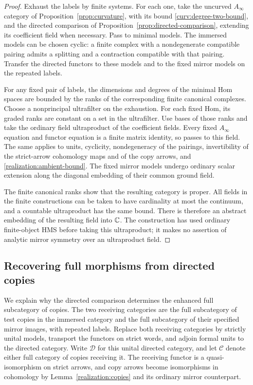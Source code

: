 \begin{proof}
Exhaust the labels by finite systems.  For each one, take the uncurved
$A_\infty$ category of Proposition~\ref{prop:curvature}, with its bound
\eqref{curv:degree-two-bound}, and the
directed comparison of Proposition~\ref{prop:directed-comparison},
extending its coefficient field when necessary.  Pass to minimal
models.  The immersed models can be chosen cyclic: a finite complex
with a nondegenerate compatible pairing admits a splitting and a
contraction compatible with that pairing.  Transfer the directed
functors to these models and to the fixed mirror models on the repeated
labels.

For any fixed pair of labels, the dimensions and degrees of the minimal
Hom spaces are bounded by the ranks of the corresponding finite
canonical complexes.  Choose a nonprincipal ultrafilter on the
exhaustion.  For each fixed Hom, its graded ranks are constant on a set
in the ultrafilter.  Use bases of those ranks and take the ordinary
field ultraproduct of the coefficient fields.  Every fixed
$A_\infty$ equation and functor equation is a finite matrix identity,
so passes to this field.  The same applies to units, cyclicity,
nondegeneracy of the pairings, invertibility of the strict-arrow
cohomology maps and of the copy arrows, and
\eqref{realization:ambient-bound}.
The fixed mirror models undergo ordinary scalar extension along the
diagonal embedding of their common ground field.

The finite canonical ranks show that the resulting category is proper.
All fields in the finite constructions can be taken to have cardinality
at most the continuum, and a countable ultraproduct has the same bound.
There is therefore an abstract embedding of the resulting field into
$\mathbb C$.  The construction has used ordinary finite-object HMS before
taking this ultraproduct; it makes no assertion of analytic mirror
symmetry over an ultraproduct field.
\end{proof}

\subsection{Recovering full morphisms from directed copies}

We explain why the directed comparison determines the enhanced full
subcategory of copies.  The two receiving categories are the full
subcategory of test copies in the immersed category and the full
subcategory of their specified mirror images, with repeated labels.
Replace both receiving categories by
strictly unital models, transport the functors on strict words, and
adjoin formal units to the directed category.  Write $\mathcal D$ for
this unital directed category, and let $\mathcal C$ denote either full
category of copies receiving it.  The receiving functor is a
quasi-isomorphism on strict arrows, and copy arrows become isomorphisms
in cohomology by Lemma~\ref{realization:copies} and its ordinary mirror
counterpart.

